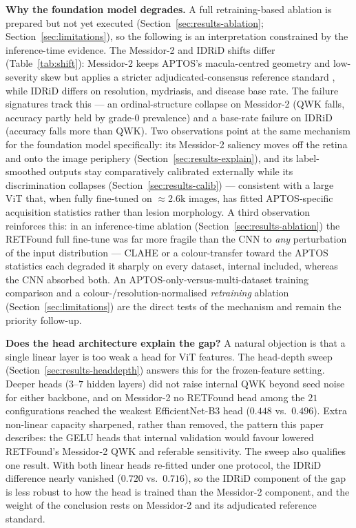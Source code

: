 \documentclass[journal]{IEEEtran}
\begin{document}
\textbf{Why the foundation model degrades.} A full retraining-based ablation is
prepared but not yet executed (Section~\ref{sec:results-ablation};
Section~\ref{sec:limitations}), so the following is an interpretation
constrained by the inference-time evidence. The Messidor-2 and IDRiD shifts differ
(Table~\ref{tab:shift}): Messidor-2 keeps APTOS's macula-centred geometry and
low-severity skew but applies a stricter adjudicated-consensus reference standard
\cite{krause2018}, while IDRiD differs on resolution, mydriasis, and disease
base rate. The failure signatures track this --- an ordinal-structure collapse on
Messidor-2 (QWK falls, accuracy partly held by grade-0 prevalence) and a
base-rate failure on IDRiD (accuracy falls more than QWK). Two observations point
at the same mechanism for the foundation model specifically: its Messidor-2
saliency moves off the retina and onto the image periphery
(Section~\ref{sec:results-explain}), and its label-smoothed outputs stay
comparatively calibrated externally while its discrimination collapses
(Section~\ref{sec:results-calib}) --- consistent with a large ViT that, when fully
fine-tuned on $\approx$2.6k images, has fitted APTOS-specific acquisition
statistics rather than lesion morphology. A third observation reinforces this: in
an inference-time ablation (Section~\ref{sec:results-ablation}) the RETFound full
fine-tune was far more fragile than the CNN to \emph{any} perturbation of the
input distribution --- CLAHE or a colour-transfer toward the APTOS statistics
each degraded it sharply on every dataset, internal included, whereas the CNN
absorbed both. An APTOS-only-versus-multi-dataset training comparison and a
colour-/resolution-normalised \emph{retraining} ablation
(Section~\ref{sec:limitations}) are the direct tests of the mechanism and remain
the priority follow-up.

\textbf{Does the head architecture explain the gap?} A natural objection is that a single linear layer is too weak a head for ViT features. The head-depth sweep (Section~\ref{sec:results-headdepth}) answers this for the frozen-feature setting. Deeper heads ($3$--$7$ hidden layers) did not raise internal QWK beyond seed noise for either backbone, and on Messidor-2 no RETFound head among the $21$ configurations reached the weakest EfficientNet-B3 head ($0.448$ vs.\ $0.496$). Extra non-linear capacity sharpened, rather than removed, the pattern this paper describes: the GELU heads that internal validation would favour lowered RETFound's Messidor-2 QWK and referable sensitivity. The sweep also qualifies one result. With both linear heads re-fitted under one protocol, the IDRiD difference nearly vanished ($0.720$ vs.\ $0.716$), so the IDRiD component of the gap is less robust to how the head is trained than the Messidor-2 component, and the weight of the conclusion rests on Messidor-2 and its adjudicated reference standard.
\end{document}
